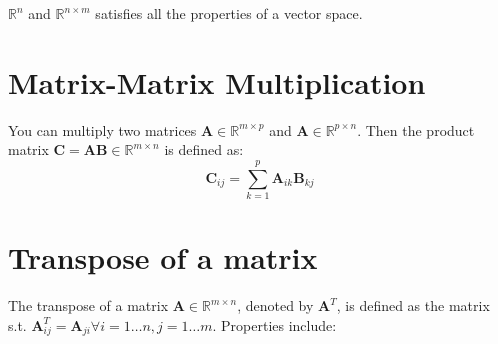 
$\mathbb{R}^n$ and $\mathbb{R}^{n \times m}$ satisfies all the properties of
a vector space.

\section{\small Matrix-Matrix Multiplication}

You can multiply two matrices $ \mathbf{A} \in \mathbb{R}^{m \times p}$
and $\mathbf{A} \in \mathbb{R}^{p \times n}$. Then the product matrix
$\mathbf{C} = \mathbf{AB} \in \mathbb{R}^{m \times n}$ is defined as:
\[
	\mathbf{C}_{ij} = \sum_{k=1}^{p} \mathbf{A}_{ik} \mathbf{B}_{kj}
\]

\section{\small Transpose of a matrix}

The transpose of a matrix $\mathbf{A} \in \mathbb{R}^{m \times n}$, denoted by
$\mathbf{A}^T$, is defined as the matrix s.t. $\mathbf{A}^T_{ij} =
	\mathbf{A}_{ji} \forall i = 1 \ldots n, j = 1 \ldots m$. Properties include:

